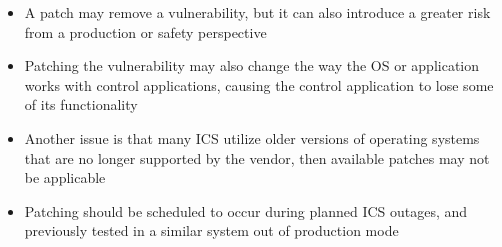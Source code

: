 \begin{itemize}
	\item A patch may remove a vulnerability, but it can also introduce a greater
risk from a production or safety perspective
	\item Patching the vulnerability may also change the way the OS or application
works with control applications, causing the control application to lose
some of its functionality
	\item Another issue is that many ICS utilize older versions of operating
systems that are no longer supported by the vendor, then available
patches may not be applicable
	\item Patching should be scheduled to occur during planned ICS outages, and
previously tested in a similar system out of production mode
\end{itemize}